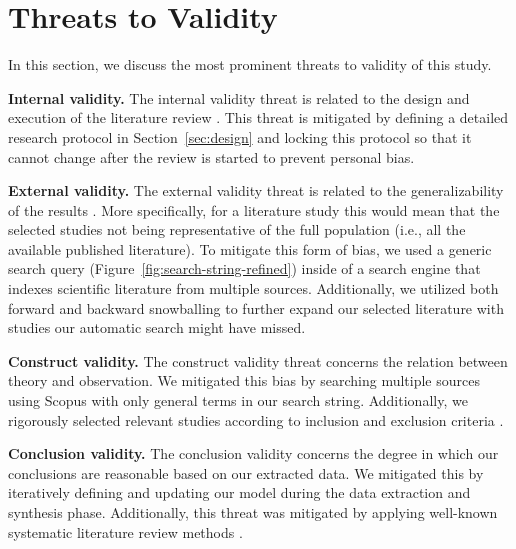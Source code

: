 \section{Threats to Validity}\label{sec:threats}
In this section, we discuss the most prominent threats to validity of this study.

\textbf{Internal validity.}
The internal validity threat is related to the design and execution of the literature review \cite{syslit3}. This threat is mitigated by defining a detailed research protocol in Section~\ref{sec:design} and locking this protocol so that it cannot change after the review is started to prevent personal bias.

\textbf{External validity.}
The external validity threat is related to the generalizability of the results \cite{syslit3}. More specifically, for a literature study this would mean that the selected studies not being representative of the full population (i.e., all the available published literature). To mitigate this form of bias, we used a generic search query (Figure~\ref{fig:search-string-refined}) inside of a search engine that indexes scientific literature from multiple sources. Additionally, we utilized both forward and backward snowballing \cite{syslit4} to further expand our selected literature with studies our automatic search might have missed.


\textbf{Construct validity.}
The construct validity threat concerns the relation between theory and observation. We mitigated this bias by searching multiple sources using Scopus with only general terms in our search string. Additionally, we rigorously selected relevant studies according to inclusion and exclusion criteria \cite{syslit1,syslit2,syslit3}.

\textbf{Conclusion validity.}
The conclusion validity concerns the degree in which our conclusions are reasonable based on our extracted data. We mitigated this by iteratively defining and updating our model during the data extraction and synthesis phase. Additionally, this threat was mitigated by applying well-known systematic literature review methods \cite{syslit1,syslit2, syslit3, syslit4}.